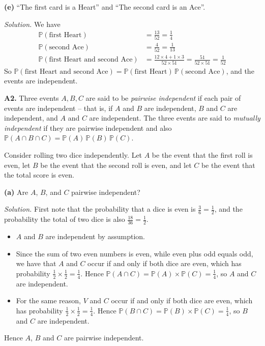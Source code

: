 \documentclass[
  a4paper,
]{book}
\providecommand{\tightlist}{%
  \setlength{\itemsep}{0pt}\setlength{\parskip}{0pt}}
\theoremstyle{definition}
\theoremstyle{definition}
\theoremstyle{definition}
\theoremstyle{definition}
\theoremstyle{remark}
\begin{document}
\textbf{(e)} ``The first card is a Heart'' and ``The second card is an Ace''.

\begin{myanswers}
\emph{Solution.}
We have
\begin{align*}
\mathbb P(\text{first Heart}) &= \frac{13}{52} = \frac14 \\
\mathbb P(\text{second Ace}) &= \frac{4}{52} = \frac1{13} \\
\mathbb P(\text{first Heart and second Ace}) &= \frac{12\times4 + 1\times 3}{52\times 51} = \frac{51}{52\times 51} = \frac{1}{52}
\end{align*}
So \(\mathbb P(\text{first Heart and second Ace}) = \mathbb P(\text{first Heart})\,\mathbb P(\text{second Ace})\), and the events are independent.

\end{myanswers}

\textbf{A2.} Three events \(A, B, C\) are said to be \emph{pairwise independent} if each pair of events are independent -- that is, if \(A\) and \(B\) are independent, \(B\) and \(C\) are independent, and \(A\) and \(C\) are independent. The three events are said to \emph{mutually independent} if they are pairwise independent and also \(\mathbb P(A \cap B \cap C) = \mathbb P(A)\,\mathbb P(B)\,\mathbb P(C)\).

Consider rolling two dice independently. Let \(A\) be the event that the first roll is even, let \(B\) be the event that the second roll is even, and let \(C\) be the event that the total score is even.

\textbf{(a)} Are \(A\), \(B\), and \(C\) pairwise independent?

\begin{myanswers}
\emph{Solution.} First note that the probability that a dice is even is \(\frac{3}{6} = \frac12\), and the probability the total of two dice is also \(\frac{18}{36} = \frac12\).

\begin{itemize}
\tightlist
\item
  \(A\) and \(B\) are independent by assumption.
\item
  Since the sum of two even numbers is even, while even plus odd equals odd, we have that \(A\) and \(C\) occur if and only if both dice are even, which has probability \(\frac12 \times \frac12 = \frac14\). Hence \(\mathbb P(A \cap C) = \mathbb P(A) \times \mathbb P(C) = \frac14\), so \(A\) and \(C\) are independent.
\item
  For the same reason, \(V\) and \(C\) occur if and only if both dice are even, which has probability \(\frac12 \times \frac12 = \frac14\). Hence \(\mathbb P(B \cap C) = \mathbb P(B) \times \mathbb P(C) = \frac14\), so \(B\) and \(C\) are independent.
\end{itemize}

Hence \(A\), \(B\) and \(C\) are pairwise independent.

\end{myanswers}
\end{document}
